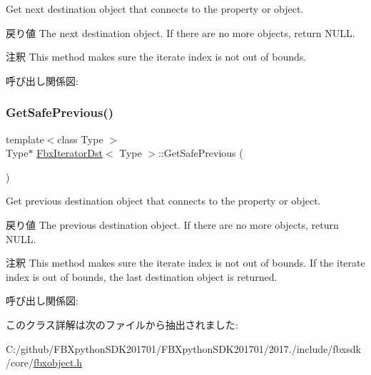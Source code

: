 Get next destination object that connects to the property or object. \begin{DoxyReturn}{戻り値}
The next destination object. If there are no more objects, return N\+U\+LL. 
\end{DoxyReturn}
\begin{DoxyRemark}{注釈}
This method makes sure the iterate index is not out of bounds. 
\end{DoxyRemark}
呼び出し関係図\+:
\mbox{\label{class_fbx_iterator_dst_a8ccdc9811e9315aa7d5d30ff595615ef}} 
\subsubsection{\texorpdfstring{Get\+Safe\+Previous()}{GetSafePrevious()}}
{\footnotesize\ttfamily template$<$class Type $>$ \\
Type$\ast$ \hyperlink{class_fbx_iterator_dst}{Fbx\+Iterator\+Dst}$<$ Type $>$\+::Get\+Safe\+Previous (\begin{DoxyParamCaption}{ }\end{DoxyParamCaption})}

Get previous destination object that connects to the property or object. \begin{DoxyReturn}{戻り値}
The previous destination object. If there are no more objects, return N\+U\+LL. 
\end{DoxyReturn}
\begin{DoxyRemark}{注釈}
This method makes sure the iterate index is not out of bounds. If the iterate index is out of bounds, the last destination object is returned. 
\end{DoxyRemark}
呼び出し関係図\+:


このクラス詳解は次のファイルから抽出されました\+:\begin{DoxyCompactItemize}
\item 
C\+:/github/\+F\+B\+Xpython\+S\+D\+K201701/\+F\+B\+Xpython\+S\+D\+K201701/2017./include/fbxsdk/core/\hyperlink{fbxobject_8h}{fbxobject.\+h}\end{DoxyCompactItemize}

